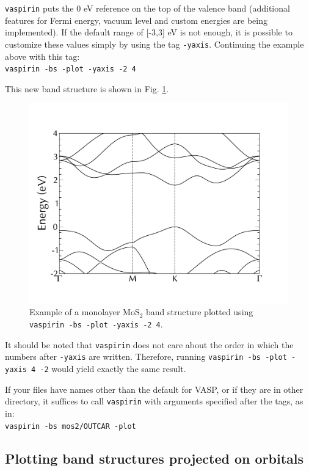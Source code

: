 \documentclass{refart}
\begin{document}
 \texttt{vaspirin} puts the 0 eV reference on the top of the valence band (additional features for Fermi energy, vacuum level and custom energies are being implemented). If the default range of [-3,3] eV is not enough, it is possible to customize these values simply by using the tag \texttt{-yaxis}. Continuing the example above with this tag:\\
\texttt{vaspirin -bs -plot -yaxis -2 4}

This new band structure is shown in Fig. \ref{fig:bs-plot-yaxis}.

\begin{figure}[h!]
	\centering
	\includegraphics[width=\textwidth]{img/bs-plot-yaxis.pdf}
	\caption{Example of a monolayer MoS$_2$ band structure plotted using \texttt{vaspirin -bs -plot -yaxis -2 4}.}
	\label{fig:bs-plot-yaxis}
\end{figure}

It should be noted that \texttt{vaspirin} does not care about the order in which the numbers after \texttt{-yaxis} are written. Therefore, running \texttt{vaspirin -bs -plot -yaxis 4 -2} would yield exactly the same result.

 If your files have names other than the default for VASP, or if they are in other directory, it suffices to call \texttt{vaspirin} with arguments specified after the tags, as in:\\
\texttt{vaspirin -bs mos2/OUTCAR -plot}

\subsection{Plotting band structures projected on orbitals}
\end{document}

